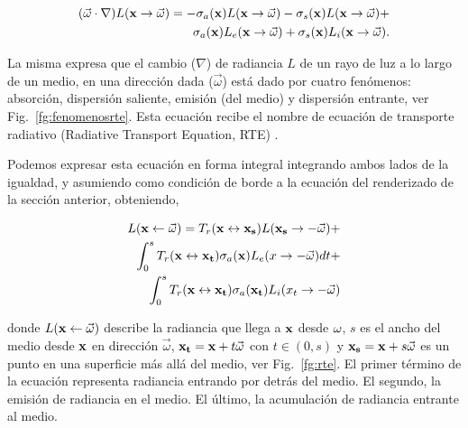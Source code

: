 \begin{equation}
\begin{aligned}
(\vec{\omega} \cdot \nabla) L(\bold{x} \rightarrow \vec{\omega}) = - \sigma_{a}(\bold{x}) L(\bold{x} \rightarrow \vec{\omega}) - \sigma_{s}(\bold{x}) L(\bold{x} \rightarrow \vec{\omega}) + \\
\sigma_{a}(\bold{x}) L_{e}(\bold{x} \rightarrow \vec{\omega}) + \sigma_{s}(\bold{x}) L_{i}(\bold{x} \rightarrow \vec{\omega}).
\end{aligned}
\end{equation}

La misma expresa que el cambio ($\nabla$) de radiancia $L$ de un rayo de luz a lo largo de un medio, en una dirección dada ($\vec{\omega}$) está dado por cuatro fenómenos:   absorción, dispersión saliente, emisión (del medio) y dispersión entrante, ver Fig.~\ref{fg:fenomenosrte}.
Esta ecuación recibe el nombre de ecuación de transporte radiativo (Radiative Transport Equation, RTE) \cite{Chandrasekhar1960}.

Podemos expresar esta ecuación en forma integral integrando ambos lados de la igualdad, y asumiendo como condición de borde a la ecuación del renderizado de la sección anterior, obteniendo,

\begin{equation}
\begin{aligned}
L(\bold{x} \leftarrow \vec{\omega}) = T_{r}(\bold{x} \leftrightarrow \bold{x_{s}}) L(\bold{x_{s}} \rightarrow -\vec{\omega}) + \\
\int_{0}^{s}{T_{r}(\bold{x} \leftrightarrow \bold{x_{t}}) \sigma_{a}(\bold{x}) L_{e}(x \rightarrow -\vec{\omega}) dt } + \\
\int_{0}^{s}{T_{r}(\bold{x} \leftrightarrow \bold{x_{t}}) \sigma_{a}(\bold{x_{t}}) L_{i}(x_{t} \rightarrow -\vec{\omega})  }
\end{aligned}
\end{equation}

donde $L(\bold{x} \leftarrow \vec{\omega})$ describe la radiancia que llega a $\bold{x}$ desde $\bold{\omega}$, $s$ es el ancho del medio desde $\bold{x}$ en dirección $\vec{\omega}$, $\bold{x_{t}} = \bold{x} + t\vec{\omega}$ con $t \in (0,s)$ y $\bold{x_{s}} = \bold{x}+ s\vec{\omega}$ es un punto en una superficie más allá del medio, ver Fig.~\ref{fg:rte}.
El primer término de la ecuación representa radiancia entrando por detrás del medio.
El segundo, la emisión de radiancia en el medio.
El último, la acumulación de radiancia entrante al medio. 

